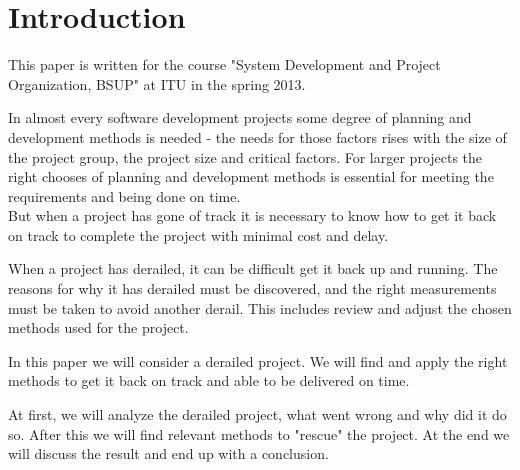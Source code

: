 \section{Introduction}
This paper is written for the course "System Development and Project Organization, BSUP" at ITU in the spring 2013.

In almost every software development projects some degree of planning and development methods is needed - the needs for those factors rises with the size of the project group, the project size and critical factors. For larger projects the right chooses of planning and development methods is essential for meeting the requirements and being done on time.\\
But when a project has gone of track it is necessary to know how to get it back on track to complete the project with minimal cost and delay.

When a project has derailed, it can be difficult get it back up and running. The reasons for why it has derailed must be discovered, and the right measurements must be taken to avoid another derail. This includes review and adjust the chosen methods used for the project.

In this paper we will consider a derailed project. We will find and apply the right methods to get it back on track and able to be delivered on time.

At first, we will analyze the derailed project, what went wrong and why did it do so. After this we will find relevant methods to "rescue" the project. At the end we will discuss the result and end up with a conclusion.
\newpage